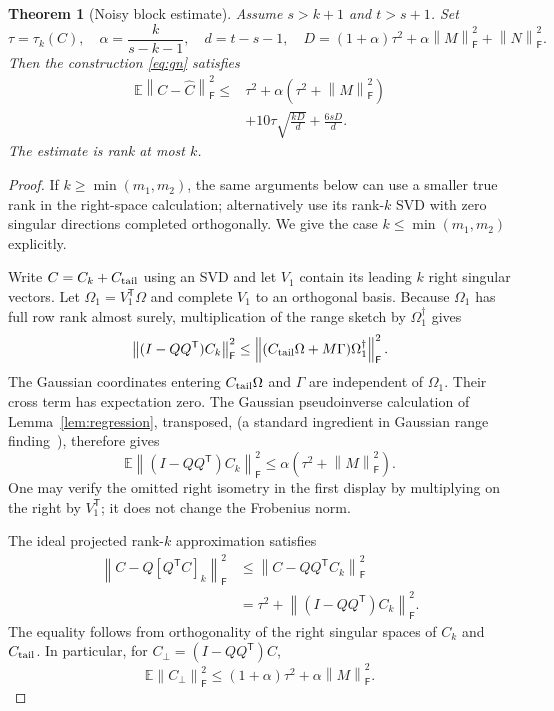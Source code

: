 \documentclass[11pt]{article}
\newtheorem{theorem}{Theorem}[section]
\theoremstyle{remark}
\newcommand{\E}{\mathbb E}
\newcommand{\F}{\mathsf F}
\newcommand{\norm}[1]{\left\lVert #1\right\rVert}
\begin{document}
\begin{theorem}[Noisy block estimate]\label{thm:gn}
Assume $s>k+1$ and $t>s+1$. Set
\[
 \tau=\tau_k(C),\quad \alpha=\frac{k}{s-k-1},\quad d=t-s-1,
 \quad D=(1+\alpha)\tau^2+\alpha\norm M_\F^2+\norm N_\F^2.
\]
Then the construction \eqref{eq:gn} satisfies
\begin{align}\label{eq:gnbound}
 \E\norm{C-\widehat C}_\F^2
 \le{}&\tau^2+\alpha(\tau^2+\norm M_\F^2)\\
 &+10\tau\sqrt{\frac{kD}{d}}+\frac{6sD}{d}.\nonumber
\end{align}
The estimate is rank at most $k$.
\end{theorem}
\begin{proof}
If $k\ge\min(m_1,m_2)$, the same arguments below can use a smaller true rank
in the right-space calculation; alternatively use its rank-$k$ SVD with
zero singular directions completed orthogonally. We give the case
$k\le\min(m_1,m_2)$ explicitly.

Write $C=C_k+C_{\rm tail}$ using an SVD and let $V_1$ contain its leading
$k$ right singular vectors. Let $\Omega_1=V_1^{\mathsf T}\Omega$ and complete
$V_1$ to an orthogonal basis. Because $\Omega_1$ has full row rank almost
surely, multiplication of the range sketch by $\Omega_1^\dagger$ gives
\[
 \norm{(I-QQ^{\mathsf T})C_k}_\F^2
 \le\norm{(C_{\rm tail}\Omega+M\Gamma)\Omega_1^\dagger}_\F^2.
\]
The Gaussian coordinates entering $C_{\rm tail}\Omega$ and $\Gamma$ are
independent of $\Omega_1$. Their cross term has expectation zero. The
Gaussian pseudoinverse calculation of Lemma~\ref{lem:regression}, transposed,
(a standard ingredient in Gaussian range finding~\cite{halko}),
therefore gives
\begin{equation}\label{eq:rangemiss}
 \E\norm{(I-QQ^{\mathsf T})C_k}_\F^2
 \le\alpha(\tau^2+\norm M_\F^2).
\end{equation}
One may verify the omitted right isometry in the first display by multiplying
on the right by $V_1^{\mathsf T}$; it does not change the Frobenius norm.

The ideal projected rank-$k$ approximation satisfies
\begin{align}\label{eq:idealrange}
 \norm{C-Q[Q^{\mathsf T}C]_k}_\F^2
 &\le\norm{C-QQ^{\mathsf T}C_k}_\F^2\\
 &=\tau^2+\norm{(I-QQ^{\mathsf T})C_k}_\F^2.\nonumber
\end{align}
The equality follows from orthogonality of the right singular spaces of
$C_k$ and $C_{\rm tail}$. In particular, for $C_\perp=(I-QQ^{\mathsf T})C$,
\[
 \E\norm{C_\perp}_\F^2
 \le(1+\alpha)\tau^2+\alpha\norm M_\F^2.
\]


\end{proof}
\end{document}
